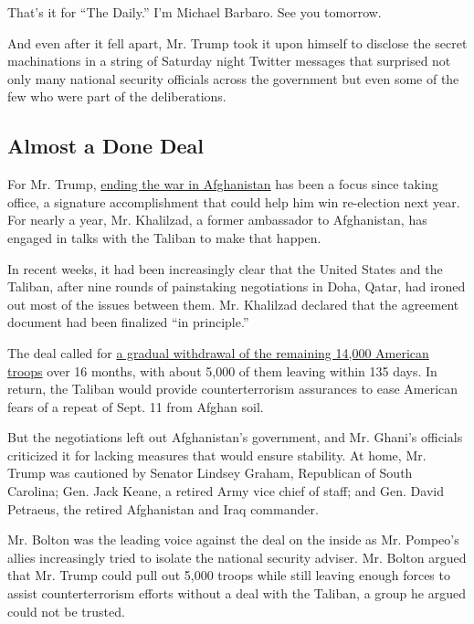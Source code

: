 That's it for ``The Daily.'' I'm Michael Barbaro. See you tomorrow.

And even after it fell apart, Mr. Trump took it upon himself to disclose
the secret machinations in a string of Saturday night Twitter messages
that surprised not only many national security officials across the
government but even some of the few who were part of the deliberations.

\hypertarget{almost-a-done-deal}{%
\subsection{Almost a Done Deal}\label{almost-a-done-deal}}

For Mr. Trump,
\href{https://www.nytimes.com/2019/09/08/us/politics/pompeo-trump-afghan-peace-negotiations.html}{ending
the war in Afghanistan} has been a focus since taking office, a
signature accomplishment that could help him win re-election next year.
For nearly a year, Mr. Khalilzad, a former ambassador to Afghanistan,
has engaged in talks with the Taliban to make that happen.

In recent weeks, it had been increasingly clear that the United States
and the Taliban, after nine rounds of painstaking negotiations in Doha,
Qatar, had ironed out most of the issues between them. Mr. Khalilzad
declared that the agreement document had been finalized ``in
principle.''

The deal called for
\href{https://www.nytimes.com/2019/09/02/world/asia/us-withdrawal-afghanistan-taliban.html?module=inline}{a
gradual withdrawal of the remaining 14,000 American troops} over 16
months, with about 5,000 of them leaving within 135 days. In return, the
Taliban would provide counterterrorism assurances to ease American fears
of a repeat of Sept. 11 from Afghan soil.

But the negotiations left out Afghanistan's government, and Mr. Ghani's
officials criticized it for lacking measures that would ensure
stability. At home, Mr. Trump was cautioned by Senator Lindsey Graham,
Republican of South Carolina; Gen. Jack Keane, a retired Army vice chief
of staff; and Gen. David Petraeus, the retired Afghanistan and Iraq
commander.

Mr. Bolton was the leading voice against the deal on the inside as Mr.
Pompeo's allies increasingly tried to isolate the national security
adviser. Mr. Bolton argued that Mr. Trump could pull out 5,000 troops
while still leaving enough forces to assist counterterrorism efforts
without a deal with the Taliban, a group he argued could not be trusted.

